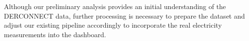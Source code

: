 \documentclass[12pt,letterpaper]{article}
\begin{document}
Although our preliminary analysis provides an initial understanding of the DERCONNECT data, further processing is necessary to prepare the dataset and adjust our existing pipeline accordingly to incorporate the real electricity measurements into the dashboard.



\makereference





\end{document}
